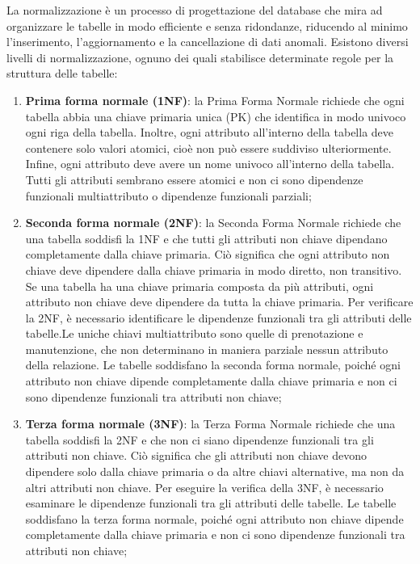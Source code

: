 \documentclass{article}
\begin{document}
    \begin{flushleft}
        La normalizzazione è un processo di progettazione del database che mira ad organizzare le tabelle in modo efficiente e senza ridondanze, riducendo al minimo l'inserimento, l'aggiornamento e la cancellazione di dati anomali. Esistono diversi livelli di normalizzazione, ognuno dei quali stabilisce determinate regole per la struttura delle tabelle:
        \begin{enumerate}
            \item \textbf{Prima forma normale (1NF)}: la Prima Forma Normale richiede che ogni tabella abbia una chiave primaria unica (PK) che identifica in modo univoco ogni riga della tabella. Inoltre, ogni attributo all'interno della tabella deve contenere solo valori atomici, cioè non può essere suddiviso ulteriormente. Infine, ogni attributo deve avere un nome univoco all'interno della tabella. Tutti gli attributi sembrano essere atomici e non ci sono dipendenze funzionali multiattributo o dipendenze funzionali parziali; \\
            \item \textbf{Seconda forma normale (2NF)}: la Seconda Forma Normale richiede che una tabella soddisfi la 1NF e che tutti gli attributi non chiave dipendano completamente dalla chiave primaria. Ciò significa che ogni attributo non chiave deve dipendere dalla chiave primaria in modo diretto, non transitivo. Se una tabella ha una chiave primaria composta da più attributi, ogni attributo non chiave deve dipendere da tutta la chiave primaria. Per verificare la 2NF, è necessario identificare le dipendenze funzionali tra gli attributi delle tabelle.Le uniche chiavi multiattributo sono quelle di prenotazione e manutenzione, che non determinano in maniera parziale nessun attributo della relazione. Le tabelle soddisfano la seconda forma normale, poiché ogni attributo non chiave dipende completamente dalla chiave primaria e non ci sono dipendenze funzionali tra attributi non chiave; \\
            \item \textbf{Terza forma normale (3NF)}: la Terza Forma Normale richiede che una tabella soddisfi la 2NF e che non ci siano dipendenze funzionali tra gli attributi non chiave. Ciò significa che gli attributi non chiave devono dipendere solo dalla chiave primaria o da altre chiavi alternative, ma non da altri attributi non chiave. Per eseguire la verifica della 3NF, è necessario esaminare le dipendenze funzionali tra gli attributi delle tabelle. Le tabelle soddisfano la terza forma normale, poiché ogni attributo non chiave dipende completamente dalla chiave primaria e non ci sono dipendenze funzionali tra attributi non chiave; \\

\end{enumerate}
\end{flushleft}
\end{document}
